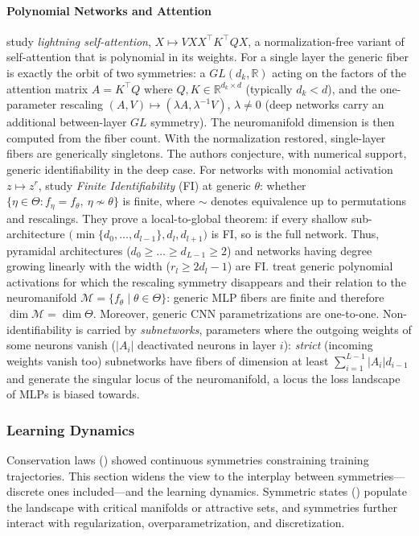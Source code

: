 \documentclass[mathematics,review,submit,moreauthors]{Definitions/mdpi}
\begin{document}
\paragraph{Polynomial Networks and Attention}
\citet{henry2025} study \emph{lightning self-attention}, $X\mapsto VXX^{\top}K^{\top}QX$, a normalization-free variant of self-attention that is polynomial in its weights.
For a single layer the generic fiber is exactly the orbit of two symmetries: a $GL(d_k,\mathbb{R})$ acting on the factors of the attention matrix $A=K^{\top}Q$ where $Q, K\in \mathbb R^{d_k\times d}$ (typically $d_k<d$), and the one-parameter rescaling $(A,V)\mapsto(\lambda A,\lambda^{-1}V)$, $\lambda\neq0$ (deep networks carry an additional between-layer $GL$ symmetry).
The neuromanifold dimension is then computed from the fiber count.
With the normalization restored, single-layer fibers are generically singletons. The authors conjecture, with numerical support, generic identifiability in the deep case.
For networks with monomial activation $z\mapsto z^{r}$, \citet{usevich2025} study \emph{Finite Identifiability} (FI) at generic $\theta$: whether $\{\eta\in\Theta : f_\eta=f_\theta,\ \eta\nsim\theta\}$ is finite, where $\sim$ denotes equivalence up to permutations and rescalings.
They prove a local-to-global theorem: if every shallow sub-architecture $\big(\min\{d_0,\dots,d_{l-1}\},d_l,d_{l+1}\big)$ is FI, so is the full network.
Thus, pyramidal architectures ($d_0\ge\dots\ge d_{L-1}\ge2$) and networks having degree growing linearly with the width ($r_l\ge 2d_l-1$) are FI.
\citet{shahverdi2026} treat generic polynomial activations for which the rescaling symmetry disappears and their relation to the neuromanifold $\mathcal{M}=\{f_{\theta} \mid \theta \in \Theta \}$: generic MLP fibers are finite and therefore $\dim\mathcal{M}=\dim\Theta$.
Moreover, generic CNN parametrizations are one-to-one.
Non-identifiability is carried by \emph{subnetworks}, parameters where the outgoing weights of some neurons vanish ($|A_i|$ deactivated neurons in layer $i$): \emph{strict} (incoming weights vanish too) subnetworks have fibers of dimension at least $\sum_{i=1}^{L-1}|A_i|d_{i-1}$ and generate the singular locus of the neuromanifold, a locus the loss landscape of MLPs is biased towards.

\subsubsection{Learning Dynamics}\label{sec:learning-dynamics}
Conservation laws () showed continuous symmetries constraining training trajectories.
This section widens the view to the interplay between symmetries---discrete ones included---and the learning dynamics.
Symmetric states () populate the landscape with critical manifolds or attractive sets, and symmetries further interact with regularization, overparametrization, and discretization.
\end{document}
